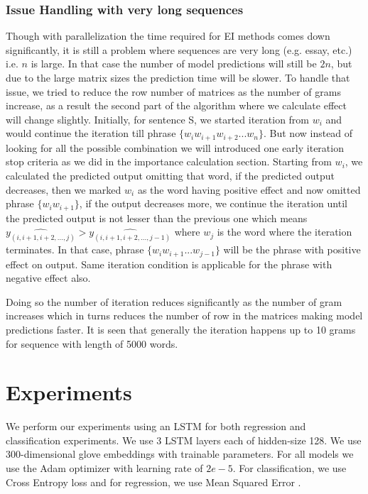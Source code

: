\documentclass[11pt]{article}
\begin{document}
\subsubsection{Issue Handling with very long sequences}
Though with parallelization the time required for EI methods comes down significantly, it is still a problem where sequences are very long (e.g. essay, etc.) i.e. $n$ is large. In that case the number of model predictions will still be $2n$, but due to the large matrix sizes the prediction time will be slower. To handle that issue, we tried to reduce the row number of matrices as the number of grams increase, as a result the second part of the algorithm where we calculate effect will change slightly. Initially, for sentence S, we started iteration from $w_i$ and would continue the iteration till phrase $\{w_i w_{i+1} w_{i+2}...w_n\}$. But now instead of looking for all the possible combination we will introduced one early iteration stop criteria as we did in the importance calculation section. Starting from $w_i$, we calculated the predicted output omitting that word, if the predicted output decreases, then we marked $w_i$ as the word having positive effect and now omitted phrase $\{w_i w_{i+1}\}$, if the output decreases more, we continue the iteration until the predicted output is not lesser than the previous one which means $\hat{y_{(i, i+1,i+2,...,j)}} > \hat{y_{(i, i+1,i+2,...,j-1)}}$ where $w_j$ is the word where the iteration terminates. In that case, phrase $\{w_i w_{i+1} ... w_{j-1}\}$ will be the phrase with positive effect on output. Same iteration condition is applicable for the phrase with negative effect also. 

Doing so the number of iteration reduces significantly as the number of gram increases which in turns reduces the number of row in the matrices making model predictions faster. It is seen that generally the iteration happens up to 10 grams for sequence with length of 5000 words. 






\section{Experiments}

We perform our experiments using an LSTM \cite{hochreiter1997long} for both regression and classification experiments. We use 3 LSTM layers each of hidden-size 128. We use 300-dimensional glove embeddings with trainable parameters.
For all models we use the Adam \cite{kingma2014adam} optimizer with learning rate of $2e-5$. For classification, we use Cross Entropy loss \cite{zhang2018generalized} and for regression, we use Mean Squared Error \cite{wang2009mean}.
\end{document}

